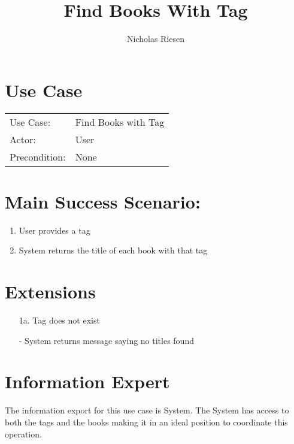 \documentclass{article}
\title{Find Books With Tag}
\author{Nicholas Riesen}
\begin{document}
\maketitle

\section*{Use Case}
\begin{tabular}{l l}
 
Use Case:     & Find Books with Tag \\
Actor:        & User                \\
Precondition: & None                \\
\end{tabular}

\section*{Main Success Scenario:}
\begin{enumerate}
    \item User provides a tag
    \item System returns the title of each book with that tag
\end{enumerate}

\section*{Extensions}
\begin{itemize}
    \item[1a.] Tag does not exist

    - System returns message saying no titles found
\end{itemize}

\section*{Information Expert}
The information export for this use case is System. The System has access to both the tags and the books making it in an ideal position to coordinate this operation. 
\end{document}
